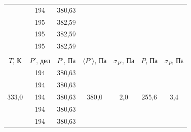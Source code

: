 \documentclass[a4paper, 12pt]{article}
\begin{document}
\begin{table}[H]
\begin{tabular}{ccccccc}
                \multicolumn{1}{|c|}{} & \multicolumn{1}{c|}{194} & \multicolumn{1}{c|}{380,63} & \multicolumn{1}{c|}{} & \multicolumn{1}{c|}{} & \multicolumn{1}{c|}{} & \multicolumn{1}{c|}{} \\ \cline{2-3}
                \multicolumn{1}{|c|}{} & \multicolumn{1}{c|}{195} & \multicolumn{1}{c|}{382,59} & \multicolumn{1}{c|}{} & \multicolumn{1}{c|}{} & \multicolumn{1}{c|}{} & \multicolumn{1}{c|}{} \\ \cline{2-3}
                \multicolumn{1}{|c|}{} & \multicolumn{1}{c|}{195} & \multicolumn{1}{c|}{382,59} & \multicolumn{1}{c|}{} & \multicolumn{1}{c|}{} & \multicolumn{1}{c|}{} & \multicolumn{1}{c|}{} \\ \cline{2-3}
                \multicolumn{1}{|c|}{} & \multicolumn{1}{c|}{195} & \multicolumn{1}{c|}{382,59} & \multicolumn{1}{c|}{} & \multicolumn{1}{c|}{} & \multicolumn{1}{c|}{} & \multicolumn{1}{c|}{} \\ \hline
    		&
    		&
    		&
    		&
    		&
    		&
    		\\ \hline
    		\multicolumn{1}{|c|}{$ T $, К} &
    		\multicolumn{1}{c|}{$ P' $, дел} &
    		\multicolumn{1}{c|}{$ P' $, Па} &
    		\multicolumn{1}{c|}{$ \langle P' \rangle $, Па} &
    		\multicolumn{1}{c|}{$ \sigma_{P'} $, Па} &
    		\multicolumn{1}{c|}{$ P $, Па} &
    		\multicolumn{1}{c|}{$ \sigma_P $, Па} \\ \hline
                \multicolumn{1}{|c|}{\multirow{10}{*}{333,0}} & \multicolumn{1}{c|}{194} & \multicolumn{1}{c|}{380,63} & \multicolumn{1}{c|}{\multirow{10}{*}{380,0}} & \multicolumn{1}{c|}{\multirow{10}{*}{2,0}} & \multicolumn{1}{c|}{\multirow{10}{*}{255,6}} & \multicolumn{1}{c|}{\multirow{10}{*}{3,4}} \\ \cline{2-3}
                \multicolumn{1}{|c|}{} & \multicolumn{1}{c|}{194} & \multicolumn{1}{c|}{380,63} & \multicolumn{1}{c|}{} & \multicolumn{1}{c|}{} & \multicolumn{1}{c|}{} & \multicolumn{1}{c|}{} \\ \cline{2-3}
                \multicolumn{1}{|c|}{} & \multicolumn{1}{c|}{194} & \multicolumn{1}{c|}{380,63} & \multicolumn{1}{c|}{} & \multicolumn{1}{c|}{} & \multicolumn{1}{c|}{} & \multicolumn{1}{c|}{} \\ \cline{2-3}
                \multicolumn{1}{|c|}{} & \multicolumn{1}{c|}{194} & \multicolumn{1}{c|}{380,63} & \multicolumn{1}{c|}{} & \multicolumn{1}{c|}{} & \multicolumn{1}{c|}{} & \multicolumn{1}{c|}{} \\ \cline{2-3}
                \multicolumn{1}{|c|}{} & \multicolumn{1}{c|}{194} & \multicolumn{1}{c|}{380,63} & \multicolumn{1}{c|}{} & \multicolumn{1}{c|}{} & \multicolumn{1}{c|}{} & \multicolumn{1}{c|}{} \\ \cline{2-3}

\end{tabular}
\end{table}
\end{document}
